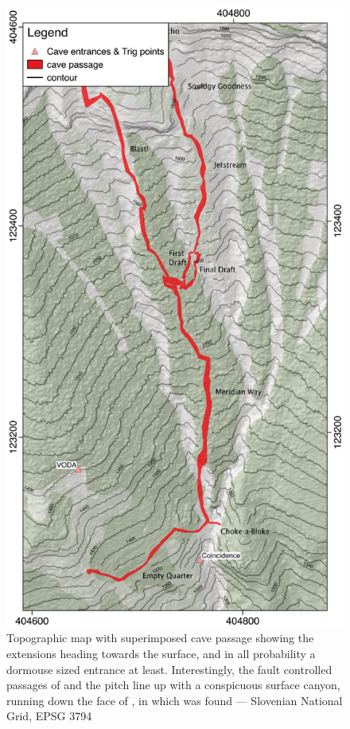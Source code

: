 \begin{figure}[t!]
\checkoddpage \ifoddpage \forcerectofloat \else \forceversofloat \fi
\centering
\includegraphics[width=\textwidth]{images/2015/tanguy-meridian-2015/meridian_map.pdf}
\caption{Topographic map with superimposed cave passage showing the \protect{} extensions heading towards the surface, and in all probability a dormouse sized entrance at least. Interestingly, the fault controlled passages of \protect{} and the \protect{} pitch line up with a conspicuous surface canyon, running down the face of \protect{}, in which \protect{} was found --- Slovenian National Grid, EPSG 3794}
\label{meridian map}
\end{figure}



